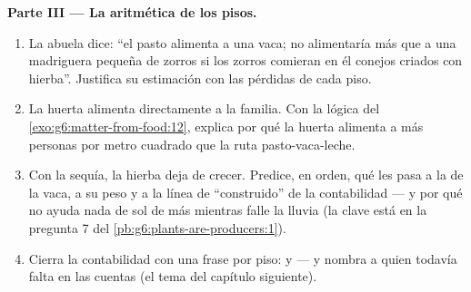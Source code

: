 \begin{problem}
\medskip\noindent\textbf{Parte III --- La aritmética de los pisos.}
\begin{enumerate}[resume]
  \item La abuela dice: ``el pasto alimenta a una vaca; no alimentaría
        más que a una madriguera pequeña de zorros si los zorros
        comieran en él conejos criados con hierba''. Justifica su
        estimación con las pérdidas de cada piso.
  \item La huerta alimenta directamente a la familia. Con la lógica del
        \cref{exo:g6:matter-from-food:12}, explica por qué la huerta
        alimenta a más personas por metro cuadrado que la ruta
        pasto-vaca-leche.
  \item Con la sequía, la hierba deja de crecer. Predice, en orden, qué
        les pasa a la  de la vaca, a su peso y a la línea de
        ``construido'' de la contabilidad --- y por qué no ayuda nada
        de sol de más mientras falle la lluvia (la clave está en la
        pregunta 7 del \cref{pb:g6:plants-are-producers:1}).
  \item Cierra la contabilidad con una frase por piso:  y
         --- y nombra a quien todavía falta en las cuentas
        (el tema del capítulo siguiente).
\end{enumerate}
\end{problem}
